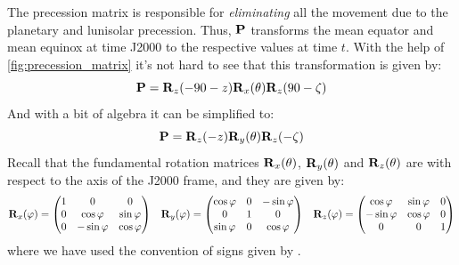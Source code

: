 \documentclass[../main.tex]{subfiles}
\begin{document}
The precession matrix is responsible for \emph{eliminating} all the movement due to the planetary and lunisolar precession. Thus, $\boldsymbol{\mathrm{P}}$ transforms the mean equator and mean equinox at time J2000 to the respective values at time $t$. With the help of \cref{fig:precession_matrix} it's not hard to see that this transformation is given by:
\begin{equation}
  \boldsymbol{\mathrm{P}}=\boldsymbol{\mathrm{R}}_z(-90-z)\boldsymbol{\mathrm{R}}_x(\theta)\boldsymbol{\mathrm{R}}_z(90-\zeta)
\end{equation}
And with a bit of algebra it can be simplified to:
\begin{equation}
  \boldsymbol{\mathrm{P}}=\boldsymbol{\mathrm{R}}_z(-z)\boldsymbol{\mathrm{R}}_y(\theta)\boldsymbol{\mathrm{R}}_z(-\zeta)
\end{equation}
Recall that the fundamental rotation matrices $\boldsymbol{\mathrm{R}}_x(\theta)$, $\boldsymbol{\mathrm{R}}_y(\theta)$ and $\boldsymbol{\mathrm{R}}_z(\theta)$ are with respect to the axis of the J2000 frame, and they are given by:
\begin{equation}
  \boldsymbol{\mathrm{R}}_x(\varphi)=\begin{pmatrix}
    1 & 0            & 0           \\
    0 & \cos\varphi  & \sin\varphi \\
    0 & -\sin\varphi & \cos\varphi
  \end{pmatrix}\;\;\;
  \boldsymbol{\mathrm{R}}_y(\varphi)=\begin{pmatrix}
    \cos\varphi & 0 & -\sin\varphi \\
    0           & 1 & 0            \\
    \sin\varphi & 0 & \cos\varphi
  \end{pmatrix}\;\;\;
  \boldsymbol{\mathrm{R}}_z(\varphi)=\begin{pmatrix}
    \cos\varphi  & \sin\varphi & 0 \\
    -\sin\varphi & \cos\varphi & 0 \\
    0            & 0           & 1
  \end{pmatrix}
\end{equation}
where we have used the convention of signs given by \cite{goldstein}.
\end{document}

